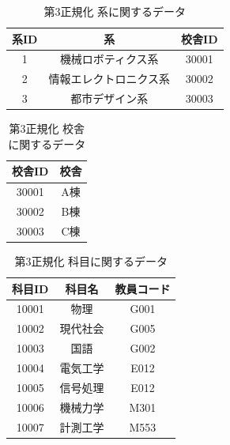 \documentclass[a4paper,11pt]{ltjsarticle}
\begin{document}
\begin{table}[htbp] %
  \centering
  \caption{第3正規化 系に関するデータ}
  \label{tab:normalized3_department}
  \begin{tabular}{|c|c|c|}
    \hline
    \textbf{系ID} & \textbf{系}  & \textbf{校舎ID} \\
    \hline

    1            & 機械ロボティクス系   & 30001         \\
    \hline

    2            & 情報エレクトロニクス系 & 30002         \\
    \hline

    3            & 都市デザイン系     & 30003         \\
    \hline
  \end{tabular}
\end{table}

\begin{table}[htbp] %
  \centering
  \caption{第3正規化 校舎に関するデータ}
  \label{tab:normalized3_campus}
  \begin{tabular}{|c|c|}
    \hline
    \textbf{校舎ID} & \textbf{校舎} \\
    \hline

    30001         & A棟          \\
    \hline

    30002         & B棟          \\
    \hline

    30003         & C棟          \\
    \hline
  \end{tabular}
\end{table}

\begin{table}[htbp] %
  \centering
  \caption{第3正規化 科目に関するデータ}
  \label{tab:normalized3_subjects}
  \begin{tabular}{|c|c|c|}
    \hline
    \textbf{科目ID} & \textbf{科目名} & \textbf{教員コード} \\
    \hline

    10001         & 物理           & G001           \\ \hline
    10002         & 現代社会         & G005           \\ \hline
    10003         & 国語           & G002           \\ \hline
    10004         & 電気工学         & E012           \\ \hline
    10005         & 信号処理         & E012           \\ \hline
    10006         & 機械力学         & M301           \\ \hline
    10007         & 計測工学         & M553           \\ \hline
  \end{tabular}
\end{table}
\end{document}
